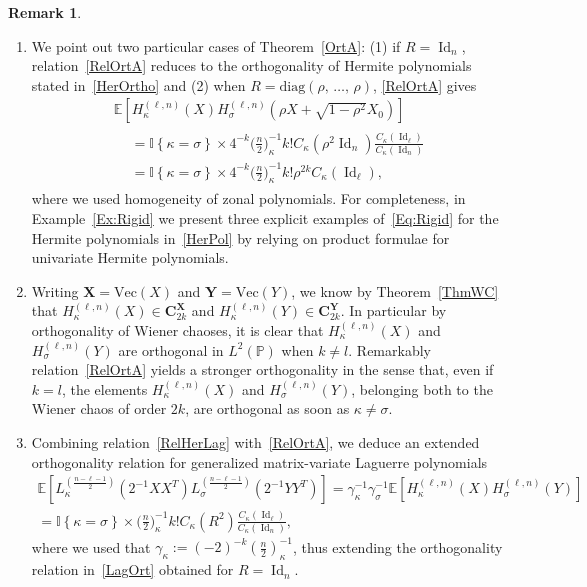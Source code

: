 \documentclass[10pt]{amsart}
\theoremstyle{definition}\newtheorem{defi}[theo]{Definition}\newtheorem{rema}[theo]{Remark}\newtheorem{exam}[theo]{Example}\newtheorem{exem}[theo]{Example}\newtheorem{nota}[theo]{Notation}
\DeclareMathOperator{\Id}{Id}
\newcommand{\diag}{\mathrm{diag}}
\renewcommand{\Vec}{\mathrm{Vec}}
\newcommand{\bfX}{\mathbf{X}}
\newcommand{\bfC}{\mathbf{C}}
\newcommand{\bfY}{\mathbf{Y}}
\newcommand{\Prob}{\mathbb{P}}
\newcommand{\E}[1]{\mathbb{E}\left[#1\right]}
\newcommand{\eqLaw}{ \overset{\mathcal{L}}{=} }
\newcommand{\ind}[1]{\mathbb{I}
\left\{#1\right\}}
\begin{document}
\begin{rema}
\begin{enumerate}
\begin{multline*}
\end{multline*}
where we used the fact that $f(X)=f(XO)$ and $g(XO^T)=g(X)$ since $f,g\in \Pi(\ell,n)$ as well as the fact that $(XO,X_0O)\eqLaw(X,X_0)$, showing in particular that $|r_j|\leq 1$ for every $j=1,\,\ldots,\,n$.
\item We point out two particular cases of Theorem~\ref{OrtA}: (1) if $R=\Id_n$, relation~\eqref{RelOrtA} reduces to the orthogonality of Hermite polynomials stated in~\eqref{HerOrtho} and (2) when $R= \diag(\rho,\,\ldots,\,\rho)$, \eqref{RelOrtA} gives
\begin{multline}\label{Eq:Rigid}
\E{H_{\kappa}^{(\ell,n)}(X) H_{\sigma}^{(\ell,n)}\left(\rho X+\sqrt{1-\rho^2}X_0\right)}\\
\begin{aligned}
&= \ind{\kappa=\sigma}\times 4^{-k}\bigg(\frac{n}{2}\bigg)_{\kappa}^{-1} k ! C_{\kappa}\left(\rho^2 \Id_n\right)\frac{C_{\kappa}(\Id_{\ell})}{C_{\kappa}(\Id_n)} \\
&= \ind{\kappa=\sigma}\times 4^{-k}\bigg(\frac{n}{2}\bigg)_{\kappa}^{-1} k ! \rho^{2k}C_{\kappa}(\Id_{\ell}), 
\end{aligned}
\end{multline}
where we used homogeneity of zonal polynomials. For completeness, in Example~\ref{Ex:Rigid} we present three explicit examples of~\eqref{Eq:Rigid} for the Hermite polynomials in~\eqref{HerPol} by relying on product formulae for univariate Hermite polynomials.
\item Writing $\bfX = \Vec(X)$ and $ \bfY = \Vec(Y)$, we know by Theorem~\ref{ThmWC} that $H_{\kappa}^{(\ell,n)}(X) \in \bfC_{2k}^{\bfX}$ and $H_{\kappa}^{(\ell,n)}(Y) \in \bfC_{2k}^{\bfY}$. In particular by orthogonality of Wiener chaoses, it is clear that $H_{\kappa}^{(\ell,n)}(X)$ and $H_{\sigma}^{(\ell,n)}(Y)$ are orthogonal in $L^2(\Prob)$ when $k\neq l$. Remarkably relation~\eqref{RelOrtA} yields a stronger orthogonality in the sense that, even if $k=l$, the elements $H_{\kappa}^{(\ell,n)}(X)$ and $H_{\sigma}^{(\ell,n)}(Y)$, belonging both to the Wiener chaos of order $2k$, are orthogonal as soon as $\kappa \neq \sigma$.
\item Combining relation~\eqref{RelHerLag} with~\eqref{RelOrtA}, we deduce an extended orthogonality relation for generalized matrix-variate Laguerre polynomials
\begin{gather*}
\E{L_{\kappa}^{\left(\frac{n-\ell-1}{2}\right)}\left(2^{-1}XX^T\right) L_{\sigma}^{\left(\frac{n-\ell-1}{2}\right)}\left(2^{-1}YY^T\right)} = \gamma_{\kappa}^{-1}
\gamma_{\sigma}^{-1}
\E{H_{\kappa}^{(\ell,n)}(X)H_{\sigma}^{(\ell,n)}(Y)}\\
= \ind{\kappa=\sigma}\times \bigg(\frac{n}{2}\bigg)_{\kappa}^{-1} k ! C_{\kappa}(R^2)\frac{C_{\kappa}(\Id_{\ell})}{C_{\kappa}(\Id_n)},
\end{gather*}
where we used that $\gamma_{\kappa}:=(-2)^{-k} (\frac{n}{2})_{\kappa}^{-1}$, thus extending the orthogonality relation in~\eqref{LagOrt} obtained for $R=\Id_n$.
\end{enumerate}
\end{rema}
\end{document}
